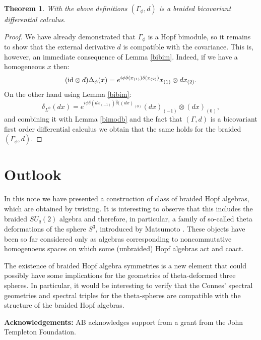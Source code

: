 \documentclass[12pt]{amsart}
\newtheorem{thm}{Theorem}[section]
\theoremstyle{definition}
\numberwithin{equation}{section}
\begin{document}
\begin{thm}
With the above definitions $(\Gamma_\phi, d)$ is a braided bicovariant differential calculus.
\end{thm}
\begin{proof}
We have already demonstrated that $\Gamma_\phi$ is a Hopf bimodule, so it 
remains to show that the external derivative $d$ is compatible with the covariance. This
is, however, an immediate consequence of Lemma \ref{bibim}. Indeed, if we have
a homogeneous $x$ then:
$$ (\hbox{id} \otimes d) \Delta_\phi(x) = e^{i\phi \delta(x_{(1)}) \delta(x_{(2)})} x_{(1)} \otimes dx_{(2)}.$$
On the other hand using Lemma \ref{bibim}:
$$ \delta_{L^\phi} (dx) = e^{i\phi \delta(dx_{(-1)}) \hat{\delta}((dx)_{(0)}} (dx)_{(-1)} \otimes
	(dx)_{(0)},$$
and combining it with Lemma \ref{bimodb} and the fact that $(\Gamma,d)$ is a
bicovariant first order differential calculus we obtain that the same holds for the
braided $(\Gamma_\phi,d)$. 
\end{proof}
\section{Outlook}
In this note we have presented a construction of class of braided Hopf algebras, which
are obtained by twisting. It is interesting to observe that this includes the braided
$SU_q(2)$ algebra and therefore, in particular, a family of so-called theta deformations
of the sphere $S^3$, introduced by Matsumoto \cite{Ma91}. These objects have been so far considered only as
algebras corresponding to noncommutative homogenoeus spaces on which some (unbraided) Hopf 
algebras act and coact. 

The existence of braided Hopf algebra symmetries is a new element that could possibly have some 
implications for the geometries of theta-deformed three spheres. In particular, it
would be interesting to verify that the Connes' spectral geometries and spectral triples
for the theta-spheres \cite{CoLa} are compatible with the structure of the braided Hopf algebras.


{\bf Acknowledgements:} AB acknowledges support from a grant from the John Templeton Foundation.

 
\end{document}
